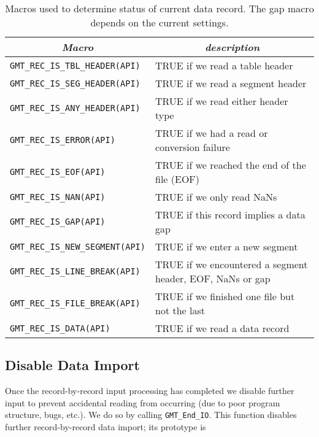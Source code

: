\documentclass[11pt]{report}
\begin{document}
\begin{table}[h]
\small
\centering
\begin{tabular}{|l|l|} \hline
\multicolumn{1}{|c|}{\emph{Macro}} & \multicolumn{1}{c|}{\emph{description}} \\ \hline
\texttt{GMT\_REC\_IS\_TBL\_HEADER(API)}	&       TRUE if we read a table header \\ \hline
\texttt{GMT\_REC\_IS\_SEG\_HEADER(API)}	&       TRUE if we read a segment header \\ \hline
\texttt{GMT\_REC\_IS\_ANY\_HEADER(API)}	&       TRUE if we read either header type \\ \hline
\texttt{GMT\_REC\_IS\_ERROR(API)}	&       TRUE if we had a read or conversion failure \\ \hline
\texttt{GMT\_REC\_IS\_EOF(API)}		&       TRUE if we reached the end of the file (EOF) \\ \hline
\texttt{GMT\_REC\_IS\_NAN(API)}		&       TRUE if we only read NaNs \\ \hline
\texttt{GMT\_REC\_IS\_GAP(API)}		&       TRUE if this record implies a data gap \\ \hline
\texttt{GMT\_REC\_IS\_NEW\_SEGMENT(API)}&       TRUE if we enter a new segment \\ \hline
\texttt{GMT\_REC\_IS\_LINE\_BREAK(API)}	&       TRUE if we encountered a segment header, EOF, NaNs or gap \\ \hline
\texttt{GMT\_REC\_IS\_FILE\_BREAK(API)}	&       TRUE if we finished one file but not the last \\ \hline
\texttt{GMT\_REC\_IS\_DATA(API)}	&       TRUE if we read a data record \\ \hline
\end{tabular}
\caption{Macros used to determine status of current data record.  The gap macro depends on the current  settings.}
\label{tbl:iomacros}
\end{table}

\subsection{Disable Data Import}

Once the record-by-record input processing has completed we disable further input to prevent accidental
reading from occurring (due to poor program structure, bugs, etc.).  We do so by calling \texttt{GMT\_End\_IO}.  This
function disables further record-by-record data import; its prototype is
\end{document}
